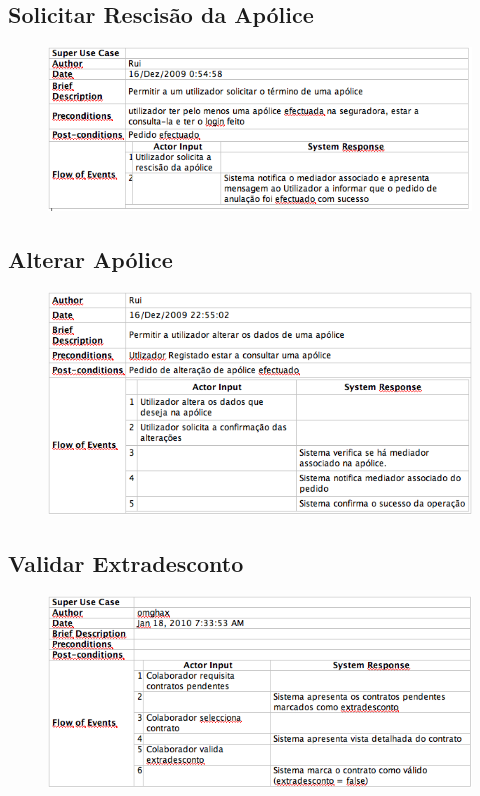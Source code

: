 \subsection{Solicitar Rescisão da Apólice}
\begin{figure}[!htb]
	\centering
	\includegraphics[scale=0.7]{images/Prints/Contratacao/SolicitarRescisaoApolice.png} 
\end{figure}


\pagebreak

\subsection{Alterar Apólice}
\begin{figure}[!htb]
	\centering
	\includegraphics[scale=0.7]{images/Prints/Contratacao/AlterarApolice.png} 
\end{figure}

\subsection{Validar Extradesconto}
\begin{figure}[!htb]
	\centering
	\includegraphics[scale=0.7]{images/Prints/Contratacao/ValidarContratoExtradesconto.png} 
\end{figure}

